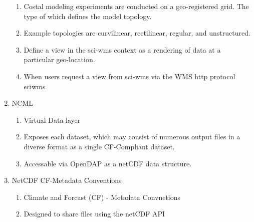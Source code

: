\documentclass{article}
\begin{document}
\begin{enumerate}
\begin{enumerate}[label*=\arabic*.]
        \item Costal modeling experiments are conducted on a
          geo-registered grid. The type of which defines the model
          topology.
        \item Example topologies are curvilinear, rectilinear, regular, and unstructured.
        \item Define a view in the sci-wms context as a rendering of data at a particular geo-location.
        \item When users request a view from sci-wms via the WMS http protocol sciwms
      \end{enumerate}
    \item NCML
      \begin{enumerate}[label*=\arabic*.]
        \item Virtual Data layer
        \item Exposes each dataset, which may consist of numerous
          output files in a diverse format as a single CF-Compliant dataset.
        \item Accessable via OpenDAP as a netCDF data structure.
      \end{enumerate}

    \item NetCDF CF-Metadata Conventions
      \begin{enumerate}[label*=\arabic*.]
        \item Climate and Forcast (CF) - Metadata Convnetions
        \item Designed to share files using the netCDF API
      \end{enumerate}
\end{enumerate}

\nocite{pyugrid}
\nocite{wms14}


\end{document}
